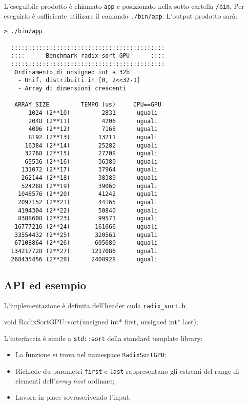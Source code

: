 L'eseguibile prodotto è chiamato \texttt{app} e posizionato nella sotto-cartella \texttt{/bin}. Per eseguirlo è sufficiente utilizare il comando \texttt{./bin/app}. L'output prodotto sarà:

\begin{lstlisting}[style=console, caption={Esecuzione ed output orodotto dell'applicativo. L'array generato ha valori uniformemente distribuiti fra {$[0, 2^{32}-1]$} ed i tempi (misurati in microsecondi) includono il trasferimento di memoria fra host e device.}, label={compile-command}]
> ./bin/app

  ::::::::::::::::::::::::::::::::::::::::::::
  ::::      Benchmark radix-sort GPU      ::::
  ::::::::::::::::::::::::::::::::::::::::::::
   Ordinamento di unsigned int a 32b        
    - Unif. distribuiti in [0, 2<<32-1]     
    - Array di dimensioni crescenti 
 
   ARRAY SIZE         TEMPO (us)     CPU==GPU  
       1024 (2**10)         2831      uguali 
       2048 (2**11)         4206      uguali 
       4096 (2**12)         7168      uguali  
       8192 (2**13)        13211      uguali  
      16384 (2**14)        25282      uguali 
      32768 (2**15)        27708      uguali 
      65536 (2**16)        36380      uguali 
     131072 (2**17)        37964      uguali  
     262144 (2**18)        38389      uguali 
     524288 (2**19)        39060      uguali 
    1048576 (2**20)        41242      uguali 
    2097152 (2**21)        44165      uguali 
    4194304 (2**22)        50840      uguali 
    8388608 (2**23)        99571      uguali 
   16777216 (2**24)       161666      uguali 
   33554432 (2**25)       320561      uguali 
   67108864 (2**26)       605680      uguali 
  134217728 (2**27)      1217086      uguali 
  268435456 (2**28)      2408928      uguali 
\end{lstlisting}

\subsection{API ed esempio}
L'implementazione è definita dell'header cuda \texttt{radix\_sort.h}.
\begin{cpp}
void RadixSortGPU::sort(unsigned int* first, unsigned int* last);
\end{cpp}
L'interfaccia è simile a \texttt{std::sort} della standard template library:
\begin{itemize}
\item La funzione si trova nel namespace \texttt{RadixSortGPU};
\item Richiede du parametri \texttt{first} e \texttt{last} rappresentano gli estremi del range di elementi dell'\textit{array host} ordinare;
\item Lavora in-place sovrascrivendo l'input.
\end{itemize} 

